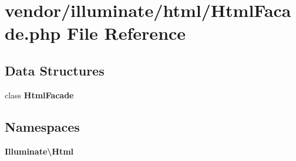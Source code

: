 \section{vendor/illuminate/html/\+Html\+Facade.php File Reference}
\label{_html_facade_8php}
\subsection*{Data Structures}
\begin{DoxyCompactItemize}
\item 
class {\bf Html\+Facade}
\end{DoxyCompactItemize}
\subsection*{Namespaces}
\begin{DoxyCompactItemize}
\item 
 {\bf Illuminate\textbackslash{}\+Html}
\end{DoxyCompactItemize}
